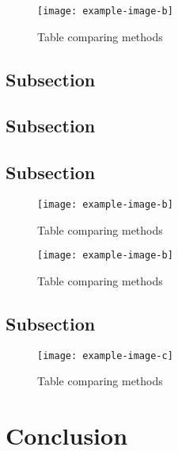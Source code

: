 \documentclass[letterpaper, 10 pt, conference]{ieeeconf}  %
\begin{document}
\begin{figure}[htbp]
    \centering
    \texttt{[image: example-image-b]}
    \caption{Table comparing methods}
    \label{fig:e}
\end{figure}

\lightlipsum[1]

\subsection{Subsection}

\lightlipsum[1]

\subsection{Subsection}

\lightlipsum[1]

\subsection{Subsection}

\lightlipsum[1-2]

\begin{figure}[htbp]
    \centering
    \texttt{[image: example-image-b]}
    \caption{Table comparing methods}
    \label{fig:e}
\end{figure}

\lightlipsum[1-2]

\begin{figure}[htbp]
    \centering
    \texttt{[image: example-image-b]}
    \caption{Table comparing methods}
    \label{fig:e}
\end{figure}

\subsection{Subsection}

\lightlipsum[1-3]

\begin{figure*}[h]
    \centering
    \texttt{[image: example-image-c]}
    \caption{Table comparing methods}
    \label{fig:d}
\end{figure*}

\lightlipsum[1-2]

\lightlipsum[1-4]

\section{Conclusion}
\lightlipsum[1]
\end{document}
